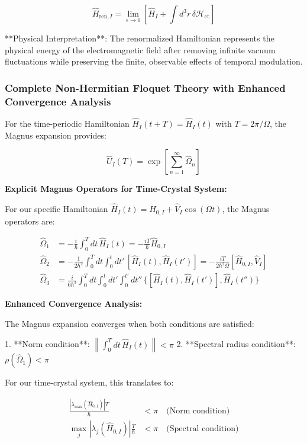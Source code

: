 \documentclass[11pt]{article}
\begin{document}
\begin{equation}
\hat{H}_{\text{ren},I} = \lim_{\epsilon \to 0} \left[ \hat{H}_I + \int d^3r \, \delta\mathcal{H}_{\text{ct}} \right]
\end{equation}

**Physical Interpretation**: The renormalized Hamiltonian represents the physical energy of the electromagnetic field after removing infinite vacuum fluctuations while preserving the finite, observable effects of temporal modulation.

\subsubsection{Complete Non-Hermitian Floquet Theory with Enhanced Convergence Analysis}

For the time-periodic Hamiltonian $\hat{H}_I(t + T) = \hat{H}_I(t)$ with $T = 2\pi/\Omega$, the Magnus expansion provides:

\begin{equation}
\hat{U}_I(T) = \exp\left[\sum_{n=1}^{\infty} \hat{\Omega}_n\right]
\end{equation}

\textbf{Explicit Magnus Operators for Time-Crystal System:}

For our specific Hamiltonian $\hat{H}_I(t) = \hat{H}_{0,I} + \hat{V}_I \cos(\Omega t)$, the Magnus operators are:

\begin{align}
\hat{\Omega}_1 &= -\frac{i}{\hbar} \int_0^T dt \, \hat{H}_I(t) = -\frac{i T}{\hbar} \hat{H}_{0,I} \\
\hat{\Omega}_2 &= -\frac{1}{2\hbar^2} \int_0^T dt \int_0^t dt' \, [\hat{H}_I(t), \hat{H}_I(t')] = -\frac{i T}{2\hbar^2 \Omega} [\hat{H}_{0,I}, \hat{V}_I] \\
\hat{\Omega}_3 &= \frac{i}{6\hbar^3} \int_0^T dt \int_0^t dt' \int_0^{t'} dt'' \, \{[\hat{H}_I(t), \hat{H}_I(t')], \hat{H}_I(t'')\}
\end{align}

\textbf{Enhanced Convergence Analysis:}

The Magnus expansion converges when both conditions are satisfied:

1. **Norm condition**: $\left\|\int_0^T dt \, \hat{H}_I(t)\right\| < \pi$
2. **Spectral radius condition**: $\rho(\hat{\Omega}_1) < \pi$

For our time-crystal system, this translates to:

\begin{align}
\frac{|\lambda_{\max}(\hat{H}_{0,I})| T}{\hbar} &< \pi \quad \text{(Norm condition)} \\
\max_j |\lambda_j(\hat{H}_{0,I})| \frac{T}{\hbar} &< \pi \quad \text{(Spectral condition)}
\end{align}
\end{document}
